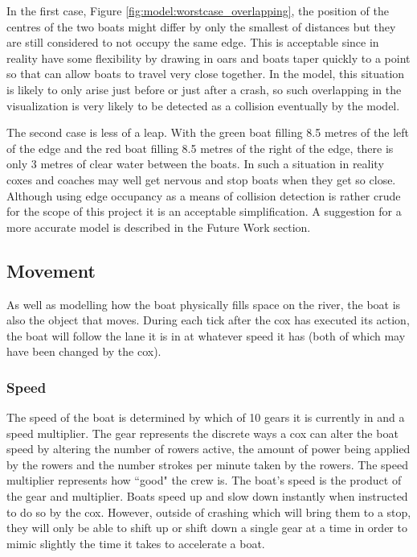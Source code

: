       In the first case, Figure \ref{fig:model:worstcase_overlapping}, the position of the centres of the two boats might differ by only the smallest of distances but they are still considered to not occupy the same edge. This is acceptable since in reality have some flexibility by drawing in oars and boats taper quickly to a point so  that can allow boats to travel very close together. In the model, this situation is likely to only arise just before or just after a crash, so such overlapping in the visualization is very likely to be detected as a collision eventually by the model.
      
      The second case is less of a leap. With the green boat filling 8.5 metres of the left of the edge and the red boat filling 8.5 metres of the right of the edge, there is only 3 metres of clear water between the boats. In such a situation in reality coxes and coaches may well get nervous and stop boats when they get so close. Although using edge occupancy as a means of collision detection is rather crude for the scope of this project it is an acceptable simplification. A suggestion for a more accurate model is described in the Future Work section.
      
      \subsection{Movement}
      As well as modelling how the boat physically fills space on the river, the boat is also the object that moves. During each tick after the cox has executed its action, the boat will follow the lane it is in at whatever speed it has (both of which may have been changed by the cox).
      
      \subsubsection{Speed}
      The speed of the boat is determined by which of 10 gears it is currently in and a speed multiplier. The gear represents the discrete ways a cox can alter the boat speed by altering the number of rowers active, the amount of power being applied by the rowers and the number strokes per minute taken by the rowers. The speed multiplier represents how ``good" the crew is. The boat's speed is the product of the gear and multiplier. Boats speed up and slow down instantly when instructed to do so by the cox. However, outside of crashing which will bring them to a stop, they will only be able to shift up or shift down a single gear at a time in order to mimic slightly the time it takes to accelerate a boat.
      
